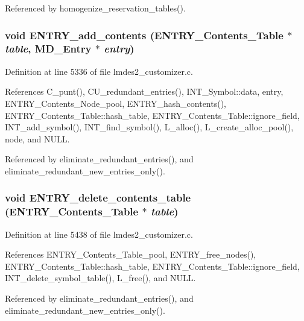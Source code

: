 Referenced by homogenize\_\-reservation\_\-tables().
\subsubsection{\setlength{\rightskip}{0pt plus 5cm}void ENTRY\_\-add\_\-contents (\bf{ENTRY\_\-Contents\_\-Table} $\ast$ {\em table}, \bf{MD\_\-Entry} $\ast$ {\em entry})}\label{lmdes2__customizer_8c_f8b740c45578bf755315091df166950f}




Definition at line 5336 of file lmdes2\_\-customizer.c.

References C\_\-punt(), CU\_\-redundant\_\-entries(), INT\_\-Symbol::data, entry, ENTRY\_\-Contents\_\-Node\_\-pool, ENTRY\_\-hash\_\-contents(), ENTRY\_\-Contents\_\-Table::hash\_\-table, ENTRY\_\-Contents\_\-Table::ignore\_\-field, INT\_\-add\_\-symbol(), INT\_\-find\_\-symbol(), L\_\-alloc(), L\_\-create\_\-alloc\_\-pool(), node, and NULL.

Referenced by eliminate\_\-redundant\_\-entries(), and eliminate\_\-redundant\_\-new\_\-entries\_\-only().
\subsubsection{\setlength{\rightskip}{0pt plus 5cm}void ENTRY\_\-delete\_\-contents\_\-table (\bf{ENTRY\_\-Contents\_\-Table} $\ast$ {\em table})}\label{lmdes2__customizer_8c_935d5d6ef4bbee76bfd07e7f15b71b71}




Definition at line 5438 of file lmdes2\_\-customizer.c.

References ENTRY\_\-Contents\_\-Table\_\-pool, ENTRY\_\-free\_\-nodes(), ENTRY\_\-Contents\_\-Table::hash\_\-table, ENTRY\_\-Contents\_\-Table::ignore\_\-field, INT\_\-delete\_\-symbol\_\-table(), L\_\-free(), and NULL.

Referenced by eliminate\_\-redundant\_\-entries(), and eliminate\_\-redundant\_\-new\_\-entries\_\-only().
